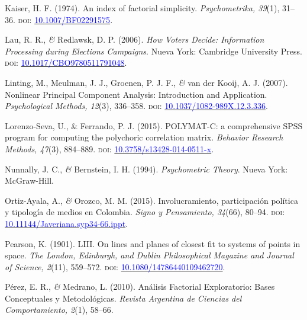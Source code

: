 \documentclass[a4paper]{tufte-handout}
\begin{document}
\begin{list}{}
\item{\small Kaiser, H. F. (1974). An index of factorial simplicity. {\itshape Psychometrika, 39}(1), 31--36. {\scshape doi:} \href{https://doi.org/10.1007/BF02291575}{\textcolor{blue}{10.1007/BF02291575}}.}

\item{\small Lau, R. R., {\itshape \&} Redlawsk, D. P. (2006). {\itshape How Voters Decide: Information Processing during Elections Campaigns}. Nueva York: Cambridge University Press. {\scshape doi:} \href{https://doi.org/10.1017/CBO9780511791048}{\textcolor{blue}{10.1017/CBO9780511791048}}.}

\item{\small Linting, M., Meulman, J. J., Groenen, P. J. F., {\itshape \&} van der Kooij, A. J. (2007). Nonlinear Principal Component Analysis: Introduction and Application. {\itshape Psychological Methods, 12}(3), 336--358. {\scshape doi:} \href{https://psycnet.apa.org/doi/10.1037/1082-989X.12.3.336}{\textcolor{blue}{10.1037/1082-989X.12.3.336}}.}

\item{\small Lorenzo-Seva, U., \& Ferrando, P. J. (2015). POLYMAT-C: a comprehensive SPSS program for computing the polychoric correlation matrix. {\itshape Behavior Research Methods, 47}(3), 884--889. {\scshape doi:} \href{https://doi.org/10.3758/s13428-014-0511-x}{\textcolor{blue}{10.3758/s13428-014-0511-x}}.}

\item{\small Nunnally, J. C., {\itshape \&} Bernstein, I. H. (1994). {\itshape Psychometric Theory}. Nueva York: McGraw-Hill.}

\item{\small Ortiz-Ayala, A., {\itshape \&} Orozco, M. M. (2015). Involucramiento, participación política y tipología de medios en Colombia. {\itshape Signo y Pensamiento, 34}(66), 80--94. {\scshape doi:} \href{https://doi.org/10.11144/Javeriana.syp34-66.ippt}{\textcolor{blue}{10.11144/Javeriana.syp34-66.ippt}}.}

\item{\small Pearson, K. (1901). LIII. On lines and planes of closest fit to systems of points in space. {\itshape The London, Edinburgh, and Dublin Philosophical Magazine and Journal of Science, 2}(11), 559--572. {\scshape doi:} \href{https://doi.org/10.1080/14786440109462720}{\textcolor{blue}{10.1080/14786440109462720}}.}

\item{\small Pérez, E. R., {\itshape \&} Medrano, L. (2010). Análisis Factorial Exploratorio: Bases Conceptuales y Metodológicas. {\itshape Revista Argentina de Ciencias del Comportamiento, 2}(1), 58--66.}


\end{list}
\end{document}
